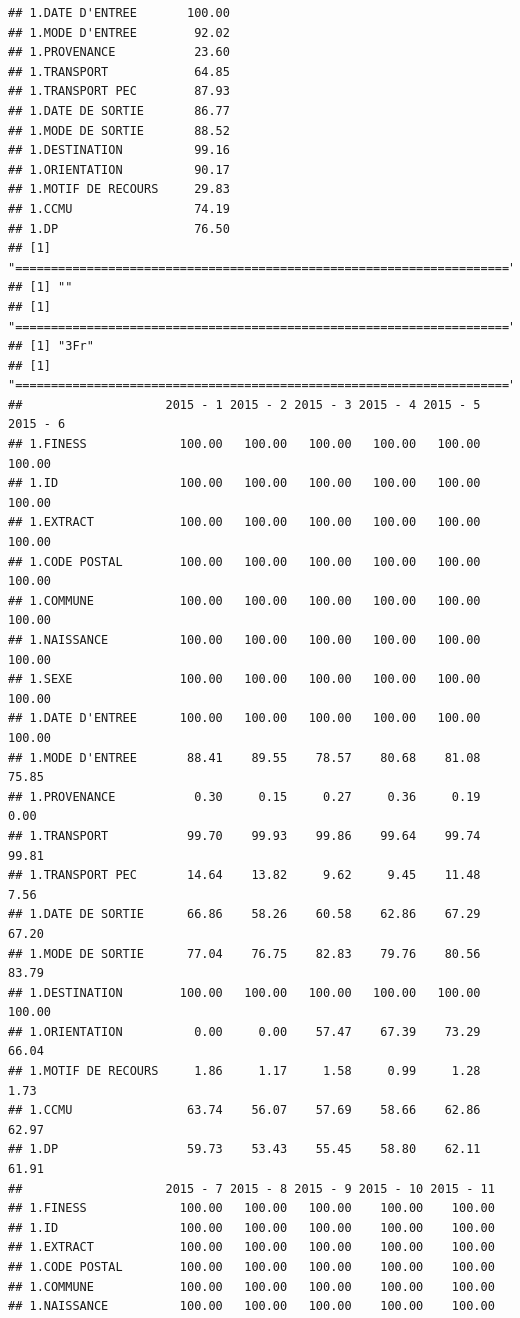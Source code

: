 \documentclass[]{article}
\begin{document}
\begin{verbatim}
## 1.DATE D'ENTREE       100.00
## 1.MODE D'ENTREE        92.02
## 1.PROVENANCE           23.60
## 1.TRANSPORT            64.85
## 1.TRANSPORT PEC        87.93
## 1.DATE DE SORTIE       86.77
## 1.MODE DE SORTIE       88.52
## 1.DESTINATION          99.16
## 1.ORIENTATION          90.17
## 1.MOTIF DE RECOURS     29.83
## 1.CCMU                 74.19
## 1.DP                   76.50
## [1] "====================================================================="
## [1] ""
## [1] "====================================================================="
## [1] "3Fr"
## [1] "====================================================================="
##                    2015 - 1 2015 - 2 2015 - 3 2015 - 4 2015 - 5 2015 - 6
## 1.FINESS             100.00   100.00   100.00   100.00   100.00   100.00
## 1.ID                 100.00   100.00   100.00   100.00   100.00   100.00
## 1.EXTRACT            100.00   100.00   100.00   100.00   100.00   100.00
## 1.CODE POSTAL        100.00   100.00   100.00   100.00   100.00   100.00
## 1.COMMUNE            100.00   100.00   100.00   100.00   100.00   100.00
## 1.NAISSANCE          100.00   100.00   100.00   100.00   100.00   100.00
## 1.SEXE               100.00   100.00   100.00   100.00   100.00   100.00
## 1.DATE D'ENTREE      100.00   100.00   100.00   100.00   100.00   100.00
## 1.MODE D'ENTREE       88.41    89.55    78.57    80.68    81.08    75.85
## 1.PROVENANCE           0.30     0.15     0.27     0.36     0.19     0.00
## 1.TRANSPORT           99.70    99.93    99.86    99.64    99.74    99.81
## 1.TRANSPORT PEC       14.64    13.82     9.62     9.45    11.48     7.56
## 1.DATE DE SORTIE      66.86    58.26    60.58    62.86    67.29    67.20
## 1.MODE DE SORTIE      77.04    76.75    82.83    79.76    80.56    83.79
## 1.DESTINATION        100.00   100.00   100.00   100.00   100.00   100.00
## 1.ORIENTATION          0.00     0.00    57.47    67.39    73.29    66.04
## 1.MOTIF DE RECOURS     1.86     1.17     1.58     0.99     1.28     1.73
## 1.CCMU                63.74    56.07    57.69    58.66    62.86    62.97
## 1.DP                  59.73    53.43    55.45    58.80    62.11    61.91
##                    2015 - 7 2015 - 8 2015 - 9 2015 - 10 2015 - 11
## 1.FINESS             100.00   100.00   100.00    100.00    100.00
## 1.ID                 100.00   100.00   100.00    100.00    100.00
## 1.EXTRACT            100.00   100.00   100.00    100.00    100.00
## 1.CODE POSTAL        100.00   100.00   100.00    100.00    100.00
## 1.COMMUNE            100.00   100.00   100.00    100.00    100.00
## 1.NAISSANCE          100.00   100.00   100.00    100.00    100.00

\end{verbatim}
\end{document}
